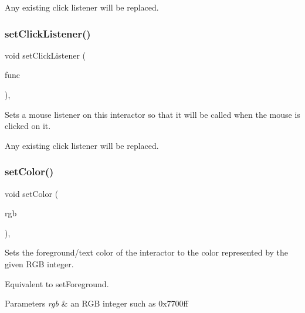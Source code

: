 Any existing click listener will be replaced. \mbox{\label{classGInteractor_a856414c92df90f56f3877475eb3f8fc4}} 
\subsubsection{\texorpdfstring{set\+Click\+Listener()}{setClickListener()}\hspace{0.1cm}{\footnotesize\ttfamily [2/2]}}
{\footnotesize\ttfamily void set\+Click\+Listener (\begin{DoxyParamCaption}\item[{G\+Event\+Listener\+Void}]{func }\end{DoxyParamCaption})\hspace{0.3cm}{\ttfamily [virtual]}, {\ttfamily [inherited]}}



Sets a mouse listener on this interactor so that it will be called when the mouse is clicked on it. 

Any existing click listener will be replaced. \mbox{\label{classGInteractor_ab1f5cc0f5cc6bbbd716a526c61f1081d}} 
\subsubsection{\texorpdfstring{set\+Color()}{setColor()}\hspace{0.1cm}{\footnotesize\ttfamily [1/2]}}
{\footnotesize\ttfamily void set\+Color (\begin{DoxyParamCaption}\item[{int}]{rgb }\end{DoxyParamCaption})\hspace{0.3cm}{\ttfamily [virtual]}, {\ttfamily [inherited]}}



Sets the foreground/text color of the interactor to the color represented by the given R\+GB integer. 

Equivalent to set\+Foreground. 
\begin{DoxyParams}{Parameters}
{\em rgb} & an R\+GB integer such as 0x7700ff \\
\hline
\end{DoxyParams}


